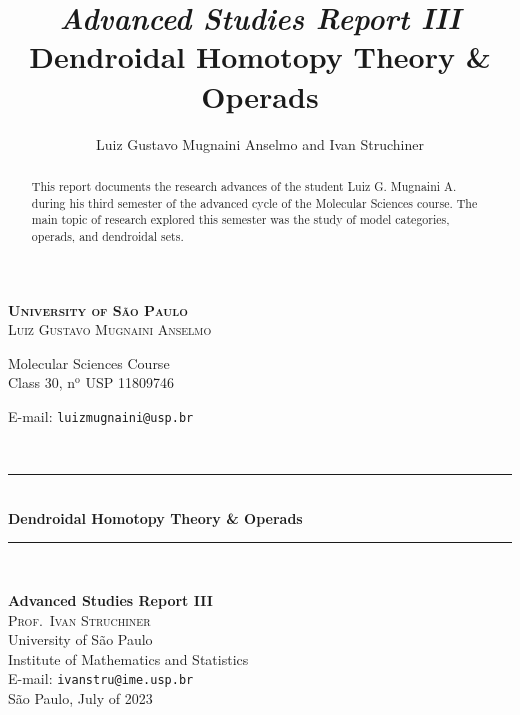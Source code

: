 \documentclass[11pt, reqno]{amsart}
\newcommand{\HRule}{\rule{\linewidth}{0.5mm}} %
\theoremstyle{definition}
\begin{document}
\begin{titlepage}
 \vfill
  \begin{center}
       \textsc{\LARGE \textbf{University of São Paulo}} \\[2.0cm]

       \vskip 0.5cm
       \textsc{\large Luiz Gustavo Mugnaini Anselmo}

       {\normalsize Molecular Sciences Course \\
         Class 30, n\(^{\text{o}}\)
         USP 11809746

       E-mail: \texttt{luizmugnaini@usp.br}}\\[2.0cm]

       \HRule\\
       \vskip 0.5cm
       {\LARGE \textbf{Dendroidal Homotopy Theory \& Operads}}
       \HRule\\[1.5cm]

       \hspace{.45\textwidth}
       \begin{minipage}{.5\textwidth}
       \normalsize \textbf{Advanced Studies Report III}\\[0.5cm]

       \textsc{\large Prof.~Ivan Struchiner}\\
       University of São Paulo \\
       Institute of Mathematics and Statistics \\
       E-mail: \texttt{ivanstru@ime.usp.br}\\[1cm]

       \normalsize São Paulo, July of 2023
       \end{minipage}
  \end{center}
\end{titlepage}

\title[Dendroidal Homotopy Theory \& Operads]{%
{\footnotesize\sl Advanced Studies Report III} \\ \smallskip
  Dendroidal Homotopy Theory \& Operads
}%

\author{%
  Luiz Gustavo Mugnaini Anselmo and Ivan Struchiner
}%

\address{%
  Institute of Mathematics and Statistics, University of São
  Paulo, Rua do Matão 1010, 05508--090~São Paulo, SP
}%


\begin{abstract}
This report documents the research advances of the student Luiz G. Mugnaini
A. during his third semester of the advanced cycle of the Molecular Sciences
course. The main topic of research explored this semester was the study of model
categories, operads, and dendroidal sets.
\end{abstract}
\maketitle
\end{document}
